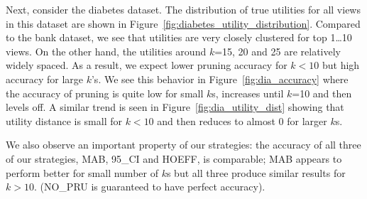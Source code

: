 
 
Next, consider the diabetes dataset.
The distribution of true utilities for all views in this dataset are shown in
Figure~\ref{fig:diabetes_utility_distribution}.
Compared to the bank dataset, we see that utilities are very closely
clustered for top 1\ldots10 views.
On the other hand, the utilities around $k$=15, 20 and 25 are relatively widely
spaced.
As a result, we expect lower pruning accuracy for $k<10$ but high accuracy for
large $k$'s.
We see this behavior in Figure~\ref{fig:dia_accuracy} where the accuracy of
pruning is quite low for small $k$s, increases until $k$=10 and then levels off.
A similar trend is seen in Figure~\ref{fig:dia_utility_dist} showing that
utility distance is small for $k<10$ and then reduces to almost 0 for larger
$k$s.

We also observe an important property of our strategies: the accuracy of all
three of our strategies, MAB, 95\_CI and HOEFF, is comparable; MAB appears to
perform better for small number of $k$s but all three produce similar results
for $k>10$. (NO\_PRU is guaranteed to have perfect accuracy).

